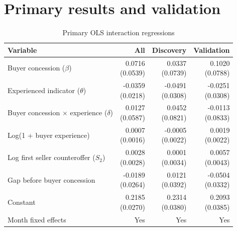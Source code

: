 \documentclass[11pt,a4paper]{article}
\begin{document}
\section{Primary results and validation}
\begin{table}[htbp]
\centering\small
\caption{Primary OLS interaction regressions}\label{tab:main}
\begin{tabular}{p{7.1cm}rrr}
\toprule
Variable & All & Discovery & Validation \\
\midrule
Buyer concession ($\beta$) & \shortstack{0.0716\\(0.0539)} & \shortstack{0.0337\\(0.0739)} & \shortstack{0.1020\\(0.0788)} \\
Experienced indicator ($\theta$) & \shortstack{-0.0359\\(0.0218)} & \shortstack{-0.0491\\(0.0308)} & \shortstack{-0.0251\\(0.0308)} \\
Buyer concession $\times$ experience ($\delta$) & \shortstack{0.0127\\(0.0587)} & \shortstack{0.0452\\(0.0821)} & \shortstack{-0.0113\\(0.0833)} \\
Log(1 + buyer experience) & \shortstack{0.0007\\(0.0016)} & \shortstack{-0.0005\\(0.0022)} & \shortstack{0.0019\\(0.0022)} \\
Log first seller counteroffer ($S_2$) & \shortstack{0.0028\\(0.0028)} & \shortstack{0.0001\\(0.0034)} & \shortstack{0.0057\\(0.0043)} \\
Gap before buyer concession & \shortstack{-0.0189\\(0.0264)} & \shortstack{0.0121\\(0.0392)} & \shortstack{-0.0504\\(0.0332)} \\
Constant & \shortstack{0.2185\\(0.0270)} & \shortstack{0.2314\\(0.0380)} & \shortstack{0.2093\\(0.0385)} \\
Month fixed effects & Yes & Yes & Yes \\

\end{tabular}
\end{table}
\end{document}
